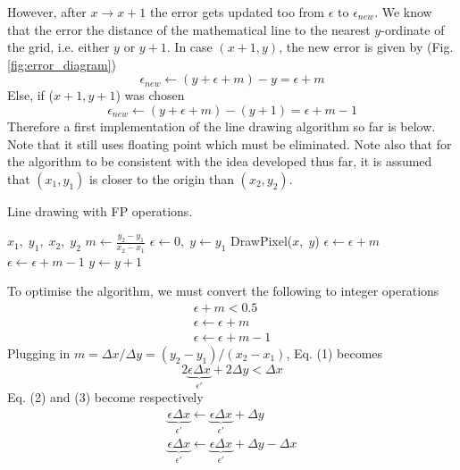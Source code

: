 \documentclass[a4paper]{article}
\begin{document}
However, after $x\rightarrow x+1$ the error gets updated too from $\epsilon$ to $\epsilon_{new}$. We know that the error the distance of the mathematical line to the nearest $y$-ordinate of the grid, i.e. either $y$ or $y+1$. In case $(x+1,y)$, the new error is given by \cite{mallinus} (Fig. \ref{fig:error_diagram})
\begin{equation}
	\epsilon_{new} \leftarrow (y+\epsilon + m) - y  = \epsilon + m
\end{equation}
Else, if ($x+1,y+1$) was chosen
\begin{equation}
	\epsilon_{new} \leftarrow (y+\epsilon + m) - (y+1) = \epsilon + m -1	
\end{equation}
Therefore a first implementation of the line drawing algorithm so far is below. Note that it still uses floating point which must be eliminated. Note also that for the algorithm to be consistent with the idea developed thus far, it is assumed that $(x_1,y_1)$ is closer to the origin than $(x_2,y_2)$.
\begin{algorithm}[H]
\caption{Line drawing with FP operations.}
\label{alg:line_drawing_fp}
\begin{algorithmic}[1]
 {$x_1,\; y_1,\; x_2,\; y_2$} 
	\State $m \leftarrow \frac{y_2-y_1}{x_2-x_1} $
	\State $\epsilon \leftarrow 0, \; y\leftarrow y_1$ 
	\State DrawPixel($x,\; y$)
		\State $\epsilon \leftarrow \epsilon + m$ 
	\Else
		\State $\epsilon \leftarrow \epsilon + m - 1$ 
		\State $y\leftarrow y + 1$
	\EndIf
\EndFor
\EndProcedure
\end{algorithmic}
\end{algorithm}
To optimise the algorithm, we must convert the following to integer operations
\begin{gather*}
\epsilon + m < 0.5 \tag{1}	\\
	\epsilon \leftarrow \epsilon + m \tag{2}\\
	\epsilon \leftarrow \epsilon + m - 1 \tag{3}
\end{gather*}
Plugging in $m=\Delta x/\Delta y = (y_2-y_1)/(x_2-x_1)$, Eq. (1) becomes
\[	
	2\underbrace{\epsilon\Delta x}_{\epsilon'}  + 2\Delta y < \Delta x \tag{1'}
\]
Eq. (2) and (3) become respectively
\begin{gather*}
	\underbrace{\epsilon\Delta x}_{\epsilon'} \leftarrow \underbrace{\epsilon \Delta x}_{\epsilon'} + \Delta y \tag{2'}\\
	\underbrace{\epsilon\Delta x}_{\epsilon'} \leftarrow \underbrace{\epsilon \Delta x}_{\epsilon'} + \Delta y - \Delta x \tag{3'}\\
\end{gather*}
\end{document}
